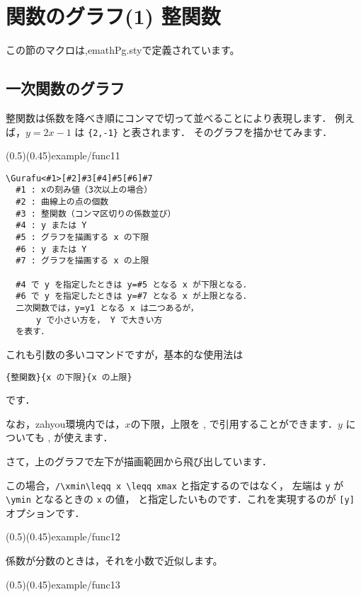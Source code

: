 \section{関数のグラフ(1) 整関数}
この節のマクロは,\textsf{emathPg.sty}で定義されています。

\subsection{一次関数のグラフ}
整関数は係数を降べき順にコンマで切って並べることにより表現します．
例えば，$y=2x-1$ は \verb+{2,-1}+ と表されます．
そのグラフを描かせてみます．

\showexample[一次関数のグラフ](0.5)(0.45){example/func11}
\vspace{3\baselineskip}

\begin{boxnote}
\begin{verbatim}
\Gurafu<#1>[#2]#3[#4]#5[#6]#7
  #1 : xの刻み値（3次以上の場合）
  #2 : 曲線上の点の個数
  #3 : 整関数（コンマ区切りの係数並び）
  #4 : y または Y
  #5 : グラフを描画する x の下限
  #6 : y または Y
  #7 : グラフを描画する x の上限

  #4 で y を指定したときは y=#5 となる x が下限となる．
  #6 で y を指定したときは y=#7 となる x が上限となる．
  二次関数では，y=y1 となる x は二つあるが，
      y で小さい方を， Y で大きい方
  を表す．
\end{verbatim}
\end{boxnote}

これも引数の多いコマンドですが，基本的な使用法は
\begin{jquote}
\verb+{整関数}{x の下限}{x の上限}+
\end{jquote}
です．

なお，\textsf{zahyou}環境内では，$x$の下限，上限を ,
 で引用することができます．$y$ についても
,  が使えます．

さて，上のグラフで左下が描画範囲から飛び出しています．

この場合，\verb+/\xmin\leqq x \leqq xmax+ と指定するのではなく，
左端は \texttt{y} が \verb+\ymin+ となるときの \texttt{x} の値，
と指定したいものです．これを実現するのが \texttt{[y]} オプションです．

\showexample(0.5)(0.45){example/func12}

係数が分数のときは，それを小数で近似します。

\showexample(0.5)(0.45){example/func13}

